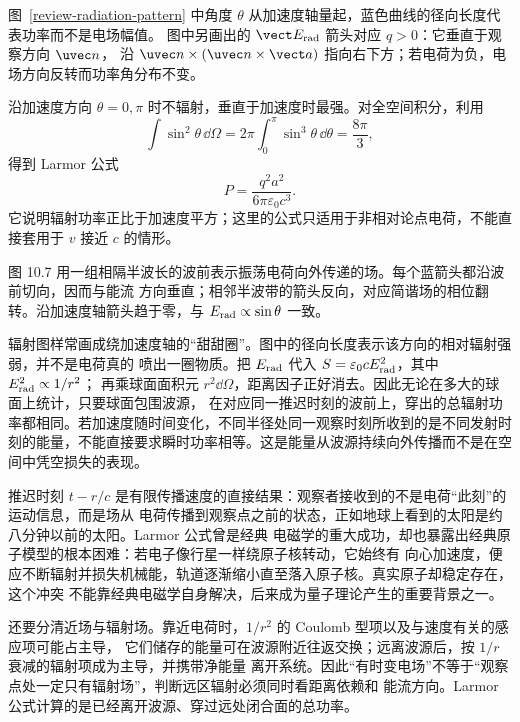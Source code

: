 图~\ref{review-radiation-pattern} 中角度 $\theta$ 从加速度轴量起，蓝色曲线的径向长度代表功率而不是电场幅值。
图中另画出的 $\vect E_{\rm rad}$ 箭头对应 $q>0$：它垂直于观察方向 $\uvec n$，
沿 $\uvec n\times(\uvec n\times\vect a)$ 指向右下方；若电荷为负，电场方向反转而功率角分布不变。

\radiationPatternDiagram

沿加速度方向 $\theta=0,\pi$ 时不辐射，垂直于加速度时最强。对全空间积分，利用
\begin{equation}
  \int\sin^2\theta\,\dd\Omega
  =2\pi\int_0^\pi\sin^3\theta\,\dd\theta=\frac{8\pi}{3},
\end{equation}
得到 Larmor 公式
\begin{equation}
  \boxed{P=\frac{q^2a^2}{6\pi\varepsilon_0c^3}}.
\end{equation}
它说明辐射功率正比于加速度平方；这里的公式只适用于非相对论点电荷，不能直接套用于
$v$ 接近 $c$ 的情形。

图 10.7 用一组相隔半波长的波前表示振荡电荷向外传递的场。每个蓝箭头都沿波前切向，因而与能流
方向垂直；相邻半波带的箭头反向，对应简谐场的相位翻转。沿加速度轴箭头趋于零，与
$E_{\rm rad}\propto\sin\theta$ 一致。

\radiationWavefrontDiagram

辐射图样常画成绕加速度轴的“甜甜圈”。图中的径向长度表示该方向的相对辐射强弱，并不是电荷真的
喷出一圈物质。把 $E_{\rm rad}$ 代入 $S=\varepsilon_0cE_{\rm rad}^2$，其中 $E_{\rm rad}^2\propto1/r^2$；
再乘球面面积元 $r^2\dd\Omega$，距离因子正好消去。因此无论在多大的球面上统计，只要球面包围波源，
在对应同一推迟时刻的波前上，穿出的总辐射功率都相同。若加速度随时间变化，不同半径处同一观察时刻所收到的是不同发射时刻的能量，不能直接要求瞬时功率相等。这是能量从波源持续向外传播而不是在空间中凭空损失的表现。

推迟时刻 $t-r/c$ 是有限传播速度的直接结果：观察者接收到的不是电荷“此刻”的运动信息，而是场从
电荷传播到观察点之前的状态，正如地球上看到的太阳是约八分钟以前的太阳。Larmor 公式曾是经典
电磁学的重大成功，却也暴露出经典原子模型的根本困难：若电子像行星一样绕原子核转动，它始终有
向心加速度，便应不断辐射并损失机械能，轨道逐渐缩小直至落入原子核。真实原子却稳定存在，这个冲突
不能靠经典电磁学自身解决，后来成为量子理论产生的重要背景之一。

还要分清近场与辐射场。靠近电荷时，$1/r^2$ 的 Coulomb 型项以及与速度有关的感应项可能占主导，
它们储存的能量可在波源附近往返交换；远离波源后，按 $1/r$ 衰减的辐射项成为主导，并携带净能量
离开系统。因此“有时变电场”不等于“观察点处一定只有辐射场”，判断远区辐射必须同时看距离依赖和
能流方向。Larmor 公式计算的是已经离开波源、穿过远处闭合面的总功率。


